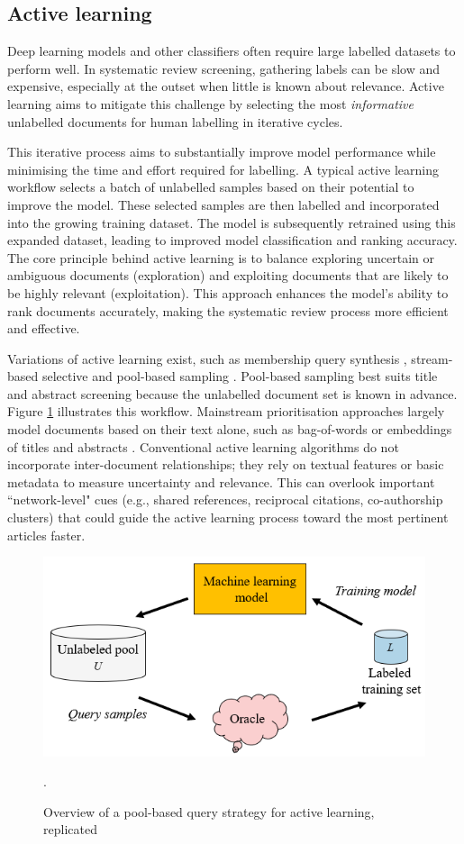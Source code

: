 \documentclass[10pt,oneside]{book}
\begin{document}
\subsection{Active learning}

Deep learning models and other classifiers often require large labelled datasets to perform well. In systematic review screening, gathering labels can be slow and expensive, especially at the outset when little is known about relevance. Active learning aims to mitigate this challenge by selecting the most \emph{informative} unlabelled documents for human labelling in iterative cycles.

This iterative process aims to substantially improve model performance while minimising the time and effort required for labelling. A typical active learning workflow selects a batch of unlabelled samples based on their potential to improve the model. These selected samples are then labelled and incorporated into the growing training dataset. The model is subsequently retrained using this expanded dataset, leading to improved model classification and ranking accuracy. The core principle behind active learning is to balance exploring uncertain or ambiguous documents (exploration) and exploiting documents that are likely to be highly relevant (exploitation). This approach enhances the model's ability to rank documents accurately, making the systematic review process more efficient and effective.

Variations of active learning exist, such as membership query synthesis \cite{angluin_queries_1988}, stream-based selective \cite{akinseloyin_novel_2024} and pool-based sampling \cite{lewis_sequential_1994}. 
Pool-based sampling best suits title and abstract screening because the unlabelled document set is known in advance. Figure \ref{fig:pool_based_query} illustrates this workflow. Mainstream prioritisation approaches largely model documents based on their text alone, such as bag-of-words or embeddings of titles and abstracts \cite{diao_lexical_2021}. Conventional active learning algorithms do not incorporate inter-document relationships; they rely on textual features or basic metadata to measure uncertainty and relevance. This can overlook important ``network-level" cues (e.g., shared references, reciprocal citations, co-authorship clusters) that could guide the active learning process toward the most pertinent articles faster.


\begin{figure}
\centering
\includegraphics[width=0.5\linewidth]{images/pool_based_strategy.png}
\caption{Overview of a pool-based query strategy for active learning, replicated \cite{ren_survey_2020}}.
\label{fig:pool_based_query}
\end{figure}
\end{document}

